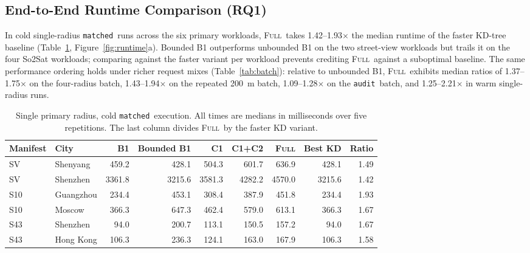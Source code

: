 \documentclass[sigconf, nonacm]{acmart}
\newcommand{\full}{\textsc{Full}}
\newcommand{\matched}{\texttt{matched}}
\newcommand{\audit}{\texttt{audit}}
\begin{document}
\subsection{End-to-End Runtime Comparison (RQ1)}
\label{sec:coverage}
In cold single-radius \matched\ runs across the six primary workloads, \full\ takes 1.42--1.93$\times$ the median runtime of the faster KD-tree baseline (Table~\ref{tab:runtime}, Figure~\ref{fig:runtime}a). Bounded B1 outperforms unbounded B1 on the two street-view workloads but trails it on the four So2Sat workloads; comparing against the faster variant per workload prevents crediting \full\ against a suboptimal baseline. The same performance ordering holds under richer request mixes (Table~\ref{tab:batch}): relative to unbounded B1, \full\ exhibits median ratios of 1.37--1.75$\times$ on the four-radius batch, 1.43--1.94$\times$ on the repeated 200~m batch, 1.09--1.28$\times$ on the \audit\ batch, and 1.25--2.21$\times$ in warm single-radius runs.

\begin{table}[t]
\caption{Single primary radius, cold \matched\ execution. All times are medians in milliseconds over five repetitions. The last column divides \full\ by the faster KD variant.}
\label{tab:runtime}\centering
\begin{tabular}{llrrrrrrr}\toprule
Manifest & City & B1 & Bounded B1 & C1 & C1+C2 & \full & Best KD & Ratio\\\midrule
SV & Shenyang & 459.2 & 428.1 & 504.3 & 601.7 & 636.9 & 428.1 & 1.49\\
SV & Shenzhen & 3361.8 & 3215.6 & 3581.3 & 4282.2 & 4570.0 & 3215.6 & 1.42\\
S10 & Guangzhou & 234.4 & 453.1 & 308.4 & 387.9 & 451.8 & 234.4 & 1.93\\
S10 & Moscow & 366.3 & 647.3 & 462.4 & 579.0 & 613.1 & 366.3 & 1.67\\
S43 & Shenzhen & 94.0 & 200.7 & 113.1 & 150.5 & 157.2 & 94.0 & 1.67\\
S43 & Hong Kong & 106.3 & 236.3 & 124.1 & 163.0 & 167.9 & 106.3 & 1.58\\\bottomrule
\end{tabular}
\end{table}
\end{document}
